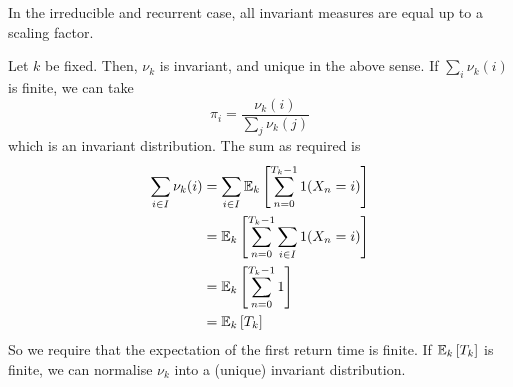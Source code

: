 \begin{remark}
	In the irreducible and recurrent case, all invariant measures are equal up to a scaling factor.
\end{remark}
Let \( k \) be fixed.
Then, \( \nu_k \) is invariant, and unique in the above sense.
If \( \sum_i \nu_k(i) \) is finite, we can take
\[
	\pi_i = \frac{\nu_k(i)}{\sum_j \nu_k(j)}
\]
which is an invariant distribution.
The sum as required is
\begin{align*}
	\sum_{i \in I} \nu_k(i) & = \sum_{i\in I} \mathbb{E}_{k}\left[{\sum_{n=0}^{T_k - 1} 1(X_n = i)}\right]  \\
	                        & = \mathbb{E}_{k}\left[{\sum_{n=0}^{T_k - 1} \sum_{i \in I} 1(X_n = i)}\right] \\
	                        & = \mathbb{E}_{k}\left[{\sum_{n=0}^{T_k - 1} 1}\right]                         \\
	                        & = \mathbb{E}_{k}\left[{T_k}\right]                                            \\
\end{align*}
So we require that the expectation of the first return time is finite.
If \( \mathbb{E}_{k}\left[{T_k}\right] \) is finite, we can normalise \( \nu_k \) into a (unique) invariant distribution.

